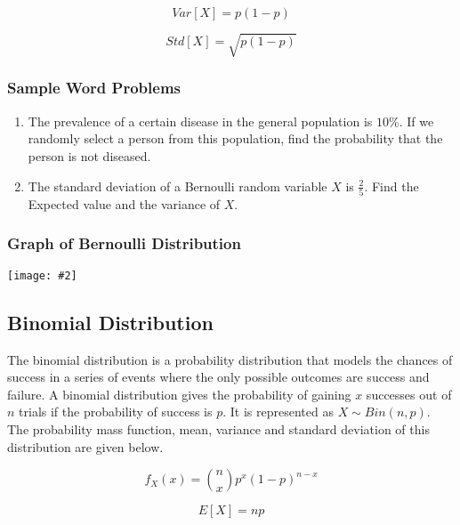 \documentclass[a4paper]{article}
\newcommand*{\newincludegraphics}[2][]{
    \begin{center}
        \begin{adjustbox}{max size={\textwidth}{\textheight}}
            \texttt{[image: \#2]}
        \end{adjustbox}
    \end{center}
}
\begin{document}
    \begin{equation}
        \label{eq:bernoulli_variance}
        Var[X] = p(1-p)
    \end{equation}

    \begin{equation}
        \label{eq:bernoulli_std}
        Std[X] = \sqrt{p(1-p)}
    \end{equation}

    \subsubsection*{Sample Word Problems}
    \begin{enumerate}
        \item The prevalence of a certain disease in the general population is $10\%$. If we randomly select a person from this population, find the probability that the person is not diseased.
        \item The standard deviation of a Bernoulli random variable $X$ is $\frac{2}{5}$. Find the Expected value and the variance of $X$.
    \end{enumerate}

    \subsubsection*{Graph of Bernoulli Distribution}
    \newincludegraphics[]{(D)-Bernoulli_distribution_visualization}

    \subsection{Binomial Distribution}
    The binomial distribution is a probability distribution that models the chances of success in a series of events where the only possible outcomes are success and failure.
    A binomial distribution gives the probability of gaining $x$ successes out of $n$ trials if the probability of success is $p$. It is represented as $X \sim Bin(n, p)$. The probability mass function, mean, variance and standard deviation of this distribution are given below.

    \begin{equation}
        \label{eq:binomial_pmf}
        f_X(x) = {n \choose x}p^{x}{(1-p)}^{n-x}
    \end{equation}

    \begin{equation}
        \label{eq:binomial_mean}
        E[X] = np
    \end{equation}
\end{document}
